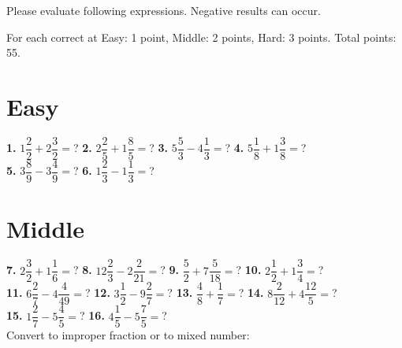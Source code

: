 \documentclass[a4paper]{article}
\begin{document}
\begin{Large}

Please evaluate following expressions. Negative results can occur.

For each correct at Easy: 1 point, Middle: 2 points, Hard: 3 points. Total points: 55.

\section* {Easy}
		
\textbf{1.} $1 \dfrac{2}{2} + 2 \dfrac{3}{2} =$? \hspace{0.6cm}
\textbf{2.} $2 \dfrac{2}{5} + 1 \dfrac{8}{5} =$? \hspace{0.6cm}
\textbf{3.} $5 \dfrac{5}{3} - 4 \dfrac{1}{3} =$? \hspace{0.6cm}
\textbf{4.} $5 \dfrac{1}{8} + 1 \dfrac{3}{8} =$? \\ [0.6cm]
\textbf{5.} $3 \dfrac{8}{9} - 3 \dfrac{4}{9} =$? \hspace{0.6cm}
\textbf{6.} $1 \dfrac{2}{3} - 1 \dfrac{1}{3} =$? \hspace{0.6cm}

\section* {Middle}
		
\textbf{7.} $ 2\dfrac{3}{2}+1\dfrac{1}{6} =$? \hspace{0.6cm}
\textbf{8.} $12\dfrac{2}{3}-2\dfrac{2}{21} =$? \hspace{0.6cm}
\textbf{9.} $\dfrac{5}{2}+7\dfrac{5}{18} =$? \hspace{0.6cm}
\textbf{10.} $2\dfrac{1}{2}+1\dfrac{3}{4} =$? \\ [0.6cm]
\textbf{11.} $6\dfrac{2}{7}-4\dfrac{4}{49} =$? \hspace{0.6cm}
\textbf{12.} $3\dfrac{1}{2}-9\dfrac{2}{7} =$? \hspace{0.6cm}
\textbf{13.} $\dfrac{4}{8}+\dfrac{1}{7} =$? \hspace{0.6cm}
\textbf{14.} $8\dfrac{2}{12}+4\dfrac{12}{5} =$? \\ [0.6cm]
\textbf{15.} $1\dfrac{2}{7}-5\dfrac{4}{5} =$?  \hspace{0.6cm}
\textbf{16.} $4\dfrac{1}{5}-5\dfrac{7}{5} =$?  \\ [0.6cm]

Convert to improper fraction or to mixed number: \\ [0.6cm]



\end{Large}
\end{document}
